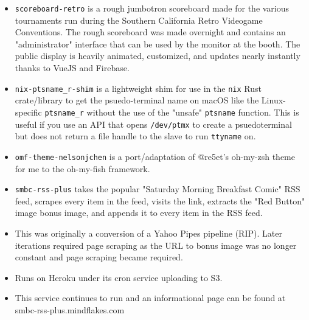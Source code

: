 \documentclass[10pt,letter,ragged2e]{altacv}
\begin{document}
\begin{paracol}{2}
\divider


\begin{itemize}
\item \texttt{scoreboard-retro} is a rough jumbotron scoreboard made for the various tournaments run during the Southern California Retro Videogame Conventions. The rough scoreboard was made overnight and contains an "administrator" interface that can be used by the monitor at the booth. The public display is heavily animated, customized, and updates nearly instantly thanks to VueJS and Firebase.
\end{itemize}

\divider


\begin{itemize}
\item \texttt{nix-ptsname\_r-shim} is a lightweight shim for use in the \texttt{nix} Rust crate/library to get the psuedo-terminal name on macOS like  the Linux-specific \texttt{ptsname\_r} without the use of the "unsafe" \texttt{ptsname} function. This is useful if you use an API that opens \texttt{/dev/ptmx} to create a psuedoterminal but does not return a file handle to the slave to run \texttt{ttyname} on.
\end{itemize}

\divider


\begin{itemize}
\item \texttt{omf-theme-nelsonjchen} is a port/adaptation of @re5et's oh-my-zsh theme for me to the oh-my-fish framework.
\end{itemize}

\divider


\begin{itemize}
\item \texttt{smbc-rss-plus} takes the popular "Saturday Morning Breakfast Comic" RSS feed, scrapes every item in the feed, visits the link, extracts the "Red Button" image bonus image, and appends it to every item in the RSS feed.
\item This was originally a conversion of a Yahoo Pipes pipeline (RIP). Later iterations required page scraping as the URL to bonus image was no longer constant and page scraping became required.
\item Runs on Heroku under its cron service uploading to S3.
\item This service continues to run and an informational page can be found at smbc-rss-plus.mindflakes.com
\end{itemize}


\end{paracol}
\end{document}
